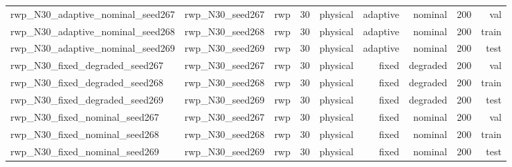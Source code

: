 \begin{tabular}{lrrrrrrrr}
rwp\_N30\_adaptive\_nominal\_seed267 & rwp\_N30\_seed267 & rwp & 30 & physical & adaptive & nominal & 200 & val \\
rwp\_N30\_adaptive\_nominal\_seed268 & rwp\_N30\_seed268 & rwp & 30 & physical & adaptive & nominal & 200 & train \\
rwp\_N30\_adaptive\_nominal\_seed269 & rwp\_N30\_seed269 & rwp & 30 & physical & adaptive & nominal & 200 & test \\
rwp\_N30\_fixed\_degraded\_seed267 & rwp\_N30\_seed267 & rwp & 30 & physical & fixed & degraded & 200 & val \\
rwp\_N30\_fixed\_degraded\_seed268 & rwp\_N30\_seed268 & rwp & 30 & physical & fixed & degraded & 200 & train \\
rwp\_N30\_fixed\_degraded\_seed269 & rwp\_N30\_seed269 & rwp & 30 & physical & fixed & degraded & 200 & test \\
rwp\_N30\_fixed\_nominal\_seed267 & rwp\_N30\_seed267 & rwp & 30 & physical & fixed & nominal & 200 & val \\
rwp\_N30\_fixed\_nominal\_seed268 & rwp\_N30\_seed268 & rwp & 30 & physical & fixed & nominal & 200 & train \\
rwp\_N30\_fixed\_nominal\_seed269 & rwp\_N30\_seed269 & rwp & 30 & physical & fixed & nominal & 200 & test \\
\bottomrule
\end{tabular}